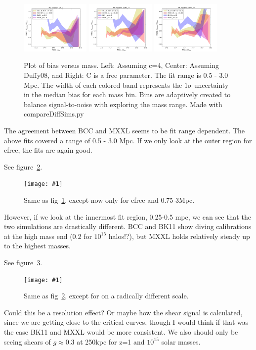 \documentclass[11pt]{article}
\newcommand{\logfig}[2]{
See figure~\ref{fig:#1}.
\begin{figure}[!ht] 
\texttt{[image: \#1]} 
\caption{#2} 
\label{fig:#1} 
\end{figure}
}
\begin{document}
\begin{figure} \centering[!ht]
\includegraphics[width=0.3\textwidth]{figures/c4_r7}
\includegraphics[width=0.3\textwidth]{figures/duffy_r7}
\includegraphics[width=0.3\textwidth]{figures/cfree_r7}
\caption{Plot of bias versus mass. Left: Assuming c=4, Center: Assuming Duffy08, and Right: C is a free parameter. The fit range is 0.5 - 3.0 Mpc. The width of each colored band represents the $1\sigma$ uncertainty in the median bias for each mass bin. Bins are adaptively created to balance signal-to-noise with exploring the mass range. Made with compareDiffSims.py}
\label{fig:comparing_r7_bias}
\end{figure}

The agreement between BCC and MXXL seems to be fit range dependent. The above fits covered a range of 0.5 - 3.0 Mpc. If we only look at the outer region for cfree, the fits are again good.

\logfig{figures/cfree_r10}{Same as fig~\ref{fig:comparing_r7_bias}, except now only for cfree and 0.75-3Mpc.}

However, if we look at the innermost fit region, 0.25-0.5 mpc, we can see that the two simulations are drastically different. BCC and BK11 show diving calibrations at the high mass end (0.2 for $10^{15}$ halos!?), but MXXL holds relatively steady up to the highest masses. 

\logfig{figures/cfree_r1}{Same as fig~\ref{fig:figures/cfree_r10}, except for on a radically different scale.}

Could this be a resolution effect? Or maybe how the shear signal is calculated, since we are getting close to the critical curves, though I would think if that was the case BK11 and MXXL would be more consistent. We also should only be seeing shears of $g\approx0.3$ at 250kpc for z=1 and $10^{15}$ solar masses.
\end{document}
